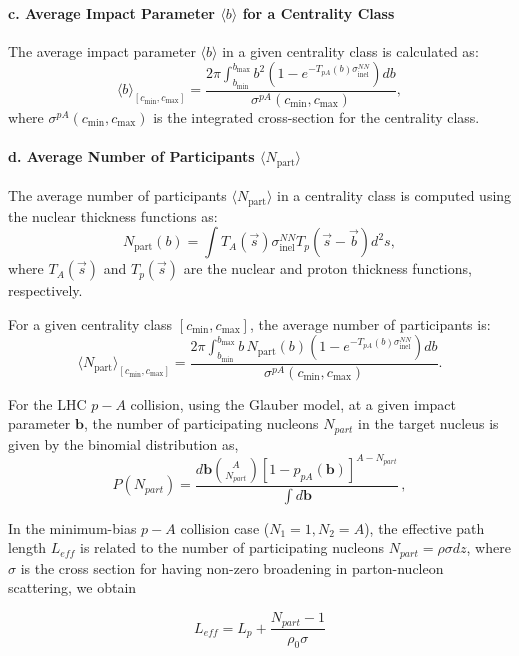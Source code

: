 \documentclass[11pt,onecolumn]{article}
\newcommand{\beq}{\begin{equation}}
\newcommand{\eeq}{\end{equation}}
\begin{document}
\paragraph{c. Average Impact Parameter \( \langle b \rangle \) for a Centrality Class}
The average impact parameter \( \langle b \rangle \) in a given centrality class is calculated as:
\[
\langle b \rangle_{[c_{\text{min}}, c_{\text{max}}]} = \frac{2 \pi \int_{b_{\text{min}}}^{b_{\text{max}}} b^2 \left( 1 - e^{-T_{pA}(b) \sigma^{NN}_{\text{inel}}} \right) db}{\sigma^{pA}(c_{\text{min}}, c_{\text{max}})},
\]
where \( \sigma^{pA}(c_{\text{min}}, c_{\text{max}}) \) is the integrated cross-section for the centrality class.
\paragraph{d. Average Number of Participants \( \langle N_{\text{part}} \rangle \)}
The average number of participants \( \langle N_{\text{part}} \rangle \) in a centrality class is computed using the nuclear thickness functions as:
\[
N_{\text{part}}(b) = \int T_A(\vec{s}) \sigma^{NN}_{\text{inel}} T_p(\vec{s} - \vec{b}) d^2 s,
\]
where \( T_A(\vec{s}) \) and \( T_p(\vec{s}) \) are the nuclear and proton thickness functions, respectively.

For a given centrality class \( [c_{\text{min}}, c_{\text{max}}] \), the average number of participants is:
\[
\langle N_{\text{part}} \rangle_{[c_{\text{min}}, c_{\text{max}}]} = \frac{2 \pi \int_{b_{\text{min}}}^{b_{\text{max}}} b \, N_{\text{part}}(b) \left( 1 - e^{-T_{pA}(b) \sigma^{NN}_{\text{inel}}} \right) db}{\sigma^{pA}(c_{\text{min}}, c_{\text{max}})}.
\]



For the LHC $p-A$ collision, using the Glauber model, at a given impact parameter $\textbf{b}$, the number of participating nucleons $N_{part}$ in the target nucleus is given by the binomial distribution as,
\beq
P(N_{part}) = \frac{d \mathbf{b} \binom{A}{N_{part}} [1-p_{pA}(\mathbf{b})]^{A-N_{part}}}{\int d\mathbf{b}} \, , 
\eeq


In the minimum-bias $p-A$ collision case ($N_1 = 1, N_2 = A $), the effective path length $L_{eff}$ is related to the number of participating nucleons $N_{part} = \rho \sigma dz$, where $\sigma$ is the cross section for having non-zero broadening in parton-nucleon scattering, we obtain

\beq
    L_{eff} =  L_p + \frac{N_{part}-1}{\rho_0 \sigma}
\eeq
\end{document}
